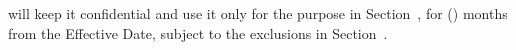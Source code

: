  will keep it confidential and use it only for the purpose in
Section~, for 
() months from the Effective Date, subject to the
exclusions in Section~.
